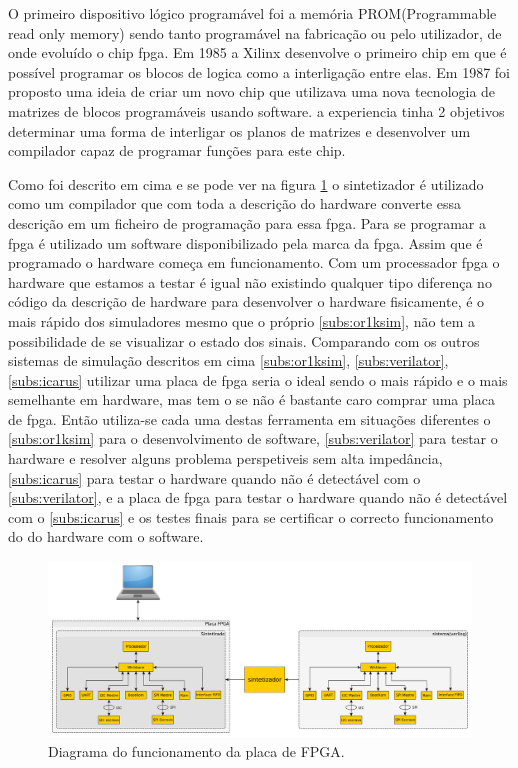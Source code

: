 O primeiro dispositivo lógico programável foi a memória \textcolor[rgb]{1,0,0}{PROM(Programmable read only memory)} sendo tanto programável na fabricação ou pelo utilizador, de onde evoluído o chip \acrshort{fpga}. Em 1985 a Xilinx desenvolve o primeiro chip em que é possível programar os blocos de logica como a interligação entre elas. Em 1987 foi proposto uma ideia de criar um novo chip que utilizava uma nova tecnologia de matrizes de blocos programáveis usando software. a experiencia tinha 2 objetivos determinar uma forma de interligar os planos de matrizes e desenvolver um compilador capaz de programar funções para este chip.

Como foi descrito em cima e se pode ver na figura \ref{fig:PlacaFPGA} o sintetizador é utilizado como um compilador que com toda a descrição do hardware converte essa descrição em um ficheiro de programação para essa \acrshort{fpga}. Para se programar a \acrshort{fpga} é utilizado um software disponibilizado pela marca da \acrshort{fpga}. Assim que é programado o hardware começa em funcionamento. Com um processador \acrshort{fpga} o hardware que estamos a testar é igual não existindo qualquer tipo diferença no código da descrição de hardware para desenvolver o hardware fisicamente, é o mais rápido dos simuladores mesmo que o próprio \ref{subs:or1ksim}, não tem a possibilidade de se visualizar o estado dos sinais. Comparando com os outros sistemas de simulação descritos em cima \ref{subs:or1ksim}, \ref{subs:verilator}, \ref{subs:icarus} utilizar uma placa de \acrshort{fpga} seria o ideal sendo o mais rápido e o mais semelhante em hardware, mas tem o se não é bastante caro comprar uma placa de \acrshort{fpga}. Então utiliza-se cada uma destas ferramenta em situações diferentes o \ref{subs:or1ksim} para o desenvolvimento de software, \ref{subs:verilator} para testar o hardware e resolver alguns problema perspetiveis sem alta impedância, \ref{subs:icarus} para testar o hardware quando não é detectável com o \ref{subs:verilator}, e a placa de \acrshort{fpga} para testar o hardware quando não é detectável com o \ref{subs:icarus} e os testes finais para se certificar o correcto funcionamento do do hardware com o software. 

\begin{figure}[!htb]
  \centering
  \includegraphics[width=1.00\textwidth]{grafos/FPGA.pdf}
  \caption[Diagrama do funcionamento da placa de FPGA]{Diagrama do funcionamento da placa de FPGA.}
  \label{fig:PlacaFPGA}
\end{figure}

